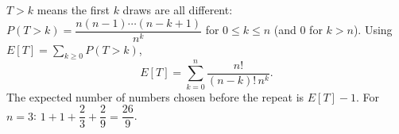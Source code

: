 $T>k$ means the first $k$ draws are all different: $P(T>k)=\dfrac{n(n-1)\cdots(n-k+1)}{n^k}$ for $0\le k\le n$ (and $0$ for $k>n$). Using $E[T]=\sum_{k\ge0}P(T>k)$,
\[E[T]=\sum_{k=0}^{n}\dfrac{n!}{(n-k)!\,n^k}.\]
The expected number of numbers chosen before the repeat is $E[T]-1$. For $n=3$: $1+1+\dfrac23+\dfrac29=\boxed{\dfrac{26}9}$.
